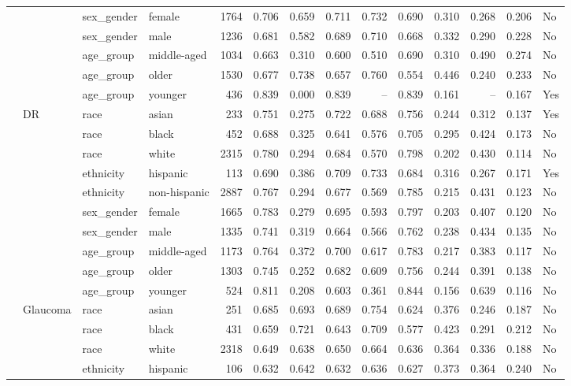 \begin{longtable}{@{}lll l rrrrrrrr@{}}
 &  & sex\_gender & female & 1764 & 0.706 & 0.659 & 0.711 & 0.732 & 0.690 & 0.310 & 0.268 & 0.206 & No \\
 &  & sex\_gender & male & 1236 & 0.681 & 0.582 & 0.689 & 0.710 & 0.668 & 0.332 & 0.290 & 0.228 & No \\
 &  & age\_group & middle-aged & 1034 & 0.663 & 0.310 & 0.600 & 0.510 & 0.690 & 0.310 & 0.490 & 0.274 & No \\
 &  & age\_group & older & 1530 & 0.677 & 0.738 & 0.657 & 0.760 & 0.554 & 0.446 & 0.240 & 0.233 & No \\
 &  & age\_group & younger & 436 & 0.839 & 0.000 & 0.839 & -- & 0.839 & 0.161 & -- & 0.167 & Yes \\
 & DR & race & asian & 233 & 0.751 & 0.275 & 0.722 & 0.688 & 0.756 & 0.244 & 0.312 & 0.137 & Yes \\
 &  & race & black & 452 & 0.688 & 0.325 & 0.641 & 0.576 & 0.705 & 0.295 & 0.424 & 0.173 & No \\
 &  & race & white & 2315 & 0.780 & 0.294 & 0.684 & 0.570 & 0.798 & 0.202 & 0.430 & 0.114 & No \\
 &  & ethnicity & hispanic & 113 & 0.690 & 0.386 & 0.709 & 0.733 & 0.684 & 0.316 & 0.267 & 0.171 & Yes \\
 &  & ethnicity & non-hispanic & 2887 & 0.767 & 0.294 & 0.677 & 0.569 & 0.785 & 0.215 & 0.431 & 0.123 & No \\
 &  & sex\_gender & female & 1665 & 0.783 & 0.279 & 0.695 & 0.593 & 0.797 & 0.203 & 0.407 & 0.120 & No \\
 &  & sex\_gender & male & 1335 & 0.741 & 0.319 & 0.664 & 0.566 & 0.762 & 0.238 & 0.434 & 0.135 & No \\
 &  & age\_group & middle-aged & 1173 & 0.764 & 0.372 & 0.700 & 0.617 & 0.783 & 0.217 & 0.383 & 0.117 & No \\
 &  & age\_group & older & 1303 & 0.745 & 0.252 & 0.682 & 0.609 & 0.756 & 0.244 & 0.391 & 0.138 & No \\
 &  & age\_group & younger & 524 & 0.811 & 0.208 & 0.603 & 0.361 & 0.844 & 0.156 & 0.639 & 0.116 & No \\
 & Glaucoma & race & asian & 251 & 0.685 & 0.693 & 0.689 & 0.754 & 0.624 & 0.376 & 0.246 & 0.187 & No \\
 &  & race & black & 431 & 0.659 & 0.721 & 0.643 & 0.709 & 0.577 & 0.423 & 0.291 & 0.212 & No \\
 &  & race & white & 2318 & 0.649 & 0.638 & 0.650 & 0.664 & 0.636 & 0.364 & 0.336 & 0.188 & No \\
 &  & ethnicity & hispanic & 106 & 0.632 & 0.642 & 0.632 & 0.636 & 0.627 & 0.373 & 0.364 & 0.240 & No \\

\end{longtable}
